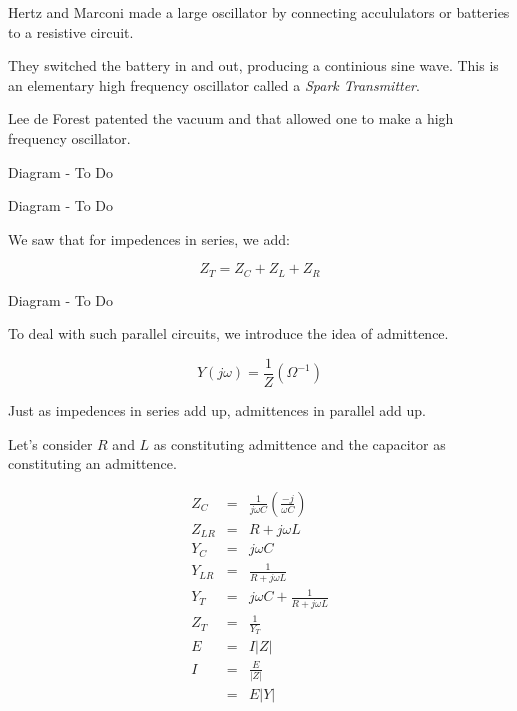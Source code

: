 \documentclass[a4paper,12pt]{article}
\begin{document}
Hertz and Marconi made a large oscillator by connecting accululators or
batteries to a resistive circuit.

They switched the battery in and out, producing a continious sine wave.
This is an elementary high frequency oscillator called a \emph{Spark
Transmitter}.

Lee de Forest patented the vacuum and that allowed one to make a high
frequency oscillator.


\begin{table}[hbtp]

Diagram - To Do

\end{table}

\begin{table}[hbtp]

Diagram - To Do

\end{table}

We saw that for impedences in series, we add:

\[ Z_{T} = Z_{C} + Z_{L} + Z_{R} \]

\begin{table}[hbtp]

Diagram - To Do

\end{table}

To deal with such parallel circuits, we introduce the idea of
admittence.

\[ Y(j \omega) = \frac{1}{Z} (\Omega^{-1}) \]

Just as impedences in series add up, admittences in parallel add up.

Let's consider $R$ and $L$ as constituting admittence and the 
capacitor as constituting an admittence.

\begin{eqnarray*}
Z_{C} & = & \frac{1}{j \omega C} \left( \frac{- j}{\omega C} \right) \\
Z_{LR} & = & R + j \omega L \\
Y_{C} & = & j \omega C \\
Y_{LR} & = & \frac{1}{R + j \omega L} \\
Y_{T} & = & j \omega C + \frac{1}{R + j \omega L} \\
Z_{T} & = & \frac{1}{Y_{T}} \\
E & = & I \left| Z \right| \\
I & = & \frac{E}{\left| Z \right|} \\
  & = & E \left| Y \right|
\end{eqnarray*}
\end{document}
